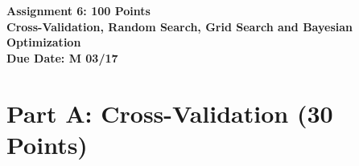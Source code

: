 \documentclass{article}
\begin{document}
\begin{center}
      \Large \textbf{Assignment 6: 100 Points}\\\textbf{Cross-Validation, Random Search,
            Grid Search and Bayesian Optimization}\\
      \vspace{0.5cm}
      \textbf{Due Date: M 03/17}
\end{center}
\section*{Part A: Cross-Validation (30 Points)}
\end{document}
